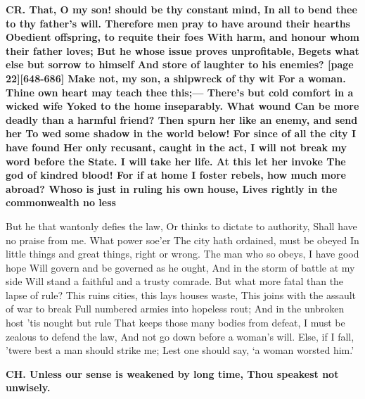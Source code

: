 \documentclass[11pt,letter]{book}
\begin{document}
\par \textbf{CR. That, O my son! should be thy constant mind, In all to bend thee to thy father’s will. Therefore men pray to have around their hearths Obedient offspring, to requite their foes With harm, and honour whom their father loves; But he whose issue proves unprofitable, Begets what else but sorrow to himself And store of laughter to his enemies? [page 22][648-686] Make not, my son, a shipwreck of thy wit For a woman. Thine own heart may teach thee this;— There’s but cold comfort in a wicked wife Yoked to the home inseparably. What wound Can be more deadly than a harmful friend? Then spurn her like an enemy, and send her To wed some shadow in the world below! For since of all the city I have found Her only recusant, caught in the act, I will not break my word before the State. I will take her life. At this let her invoke The god of kindred blood! For if at home I foster rebels, how much more abroad? Whoso is just in ruling his own house, Lives rightly in the commonwealth no less}
\par   But he that wantonly defies the law, Or thinks to dictate to authority, Shall have no praise from me. What power soe’er The city hath ordained, must be obeyed In little things and great things, right or wrong. The man who so obeys, I have good hope Will govern and be governed as he ought, And in the storm of battle at my side Will stand a faithful and a trusty comrade. But what more fatal than the lapse of rule? This ruins cities, this lays houses waste, This joins with the assault of war to break Full numbered armies into hopeless rout; And in the unbroken host ’tis nought but rule That keeps those many bodies from defeat, I must be zealous to defend the law, And not go down before a woman’s will. Else, if I fall, ’twere best a man should strike me; Lest one should say, ‘a woman worsted him.’

\par \textbf{CH. Unless our sense is weakened by long time, Thou speakest not unwisely.}
\par 
\end{document}
